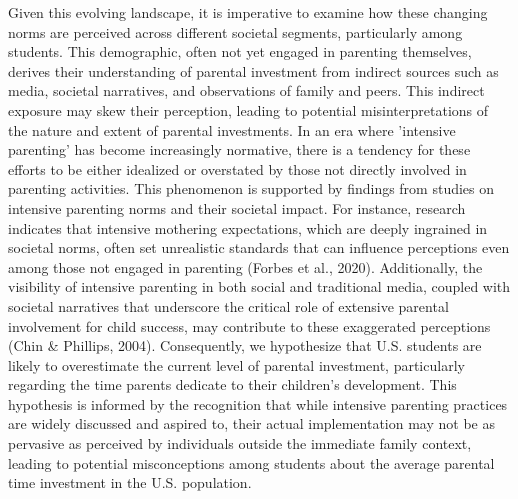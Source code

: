 Given this evolving landscape, it is imperative to examine how these changing norms are perceived across different societal segments, particularly among students. This demographic, often not yet engaged in parenting themselves, derives their understanding of parental investment from indirect sources such as media, societal narratives, and observations of family and peers. This indirect exposure may skew their perception, leading to potential misinterpretations of the nature and extent of parental investments. In an era where 'intensive parenting' has become increasingly normative, there is a tendency for these efforts to be either idealized or overstated by those not directly involved in parenting activities. This phenomenon is supported by findings from studies on intensive parenting norms and their societal impact. For instance, research indicates that intensive mothering expectations, which are deeply ingrained in societal norms, often set unrealistic standards that can influence perceptions even among those not engaged in parenting (Forbes et al., 2020). Additionally, the visibility of intensive parenting in both social and traditional media, coupled with societal narratives that underscore the critical role of extensive parental involvement for child success, may contribute to these exaggerated perceptions (Chin & Phillips, 2004). Consequently, we hypothesize that U.S. students are likely to overestimate the current level of parental investment, particularly regarding the time parents dedicate to their children's development. This hypothesis is informed by the recognition that while intensive parenting practices are widely discussed and aspired to, their actual implementation may not be as pervasive as perceived by individuals outside the immediate family context, leading to potential misconceptions among students about the average parental time investment in the U.S. population.
